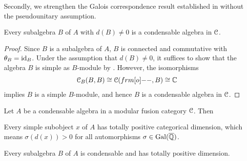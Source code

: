 \documentclass{amsart}
\begin{document}
Secondly, we  strengthen the Galois correspondence result established in \cite[Theorem II]{DNRX2025} without the pseudounitary assumption.

\begin{lem}\label{l:con_sub}
 Every subalgebra $B$ of $A$ with $d(B) \ne 0$ is a   condensable algebra in ${\EuScript{C}}$.
 \end{lem} 
 \begin{proof}
 Since  $B$ is a subalgebra of $A$, $B$ is connected and commutative with $\theta_B = \operatorname{id}_B$. Under the assumption that $d(B)\ne 0$, it suffices to show that the algebra $B$ is simple as $B$-module by \cite[Lem. 1.20]{KO02}. However,  the isomorphisms \cite[Thm. 1.6]{KO02}
 $$
\CB(B,B) \cong \CC(\1, B) \cong \BC
 $$  
 implies $B$ is a simple $B$-module, and hence $B$ is a condensable algebra in ${\EuScript{C}}$. 
 \end{proof}
 \begin{prop} \label{p:positivity} Let $A$ be a condensable algebra in a modular fusion category ${\EuScript{C}}$. Then
 \begin{enumeri}
     \item Every simple subobject $x$ of  $A$  has totally positive categorical dimension, which means $\sigma(d(x)) > 0$ for all automorphisms $\sigma  \in \operatorname{Gal}(\overline{\mathbb{Q}})$.
     \item Every subalgebra $B$ of $A$ is condensable and has  totally positive dimension.
 \end{enumeri}
 \end{prop}
\end{document}
